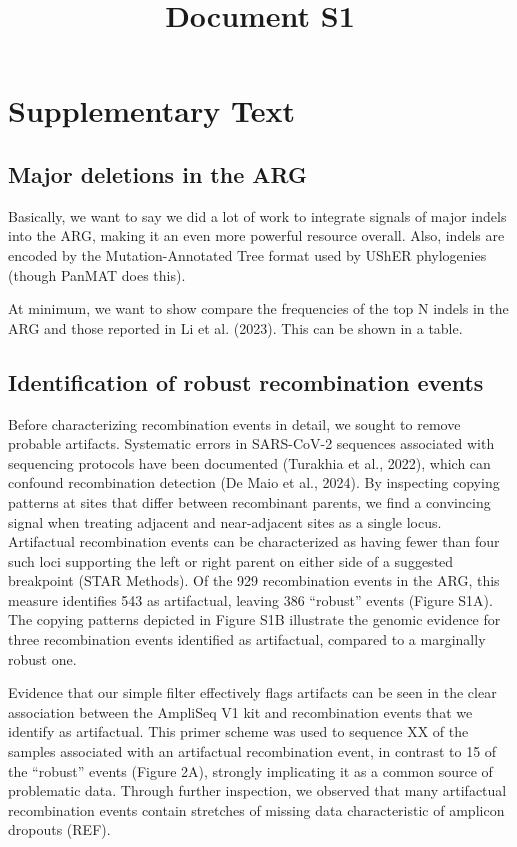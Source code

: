 \documentclass[12pt,letterpaper]{article}
\title{Document S1}
\date{}
\makeatletter
\renewcommand{\maketitle}{\bgroup\setlength{\parindent}{0pt}
\begin{flushleft}
  \textbf{\@title}

  \@author
\end{flushleft}\egroup}
\makeatother
\begin{document}
\maketitle

\section*{Supplementary Text}

\subsection{Major deletions in the ARG}
Basically, we want to say we did a lot of work to integrate signals of major indels into the ARG,
making it an even more powerful resource overall.
Also, indels are encoded by the Mutation-Annotated Tree format used by UShER phylogenies (though PanMAT does this).

At minimum, we want to show compare the frequencies of the top N indels in the ARG and those reported in Li et al. (2023).
This can be shown in a table.


\subsection*{Identification of robust recombination events}
Before characterizing recombination events in detail, we sought to remove probable artifacts.
Systematic errors in SARS-CoV-2 sequences associated with sequencing protocols have been documented (Turakhia et al., 2022),
which can confound recombination detection (De Maio et al., 2024).
By inspecting copying patterns at sites that differ between recombinant parents,
we find a convincing signal when treating adjacent and near-adjacent sites as a single locus.
Artifactual recombination events can be characterized as
having fewer than four such loci supporting the left or right parent on either side of a suggested breakpoint (STAR Methods).
Of the 929 recombination events in the ARG, this measure identifies 543 as artifactual,
leaving 386 “robust” events (Figure S1A).
The copying patterns depicted in Figure S1B illustrate the genomic evidence for
three recombination events identified as artifactual, compared to a marginally robust one.

Evidence that our simple filter effectively flags artifacts can be seen in the clear association between
the AmpliSeq V1 kit and recombination events that we identify as artifactual.
This primer scheme was used to sequence XX of the samples associated with an artifactual recombination event,
in contrast to 15 of the “robust” events (Figure 2A), strongly implicating it as a common source of problematic data.
Through further inspection, we observed that many artifactual recombination events
contain stretches of missing data characteristic of amplicon dropouts (REF).
\end{document}
